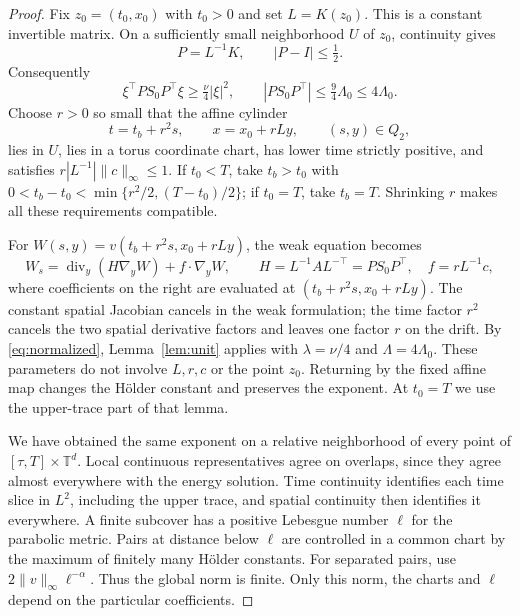 \documentclass[11pt]{article}
\newcommand{\T}{\mathbb T}
\newcommand{\diver}{\operatorname{div}}
\begin{document}
\begin{proof}
Fix $z_0=(t_0,x_0)$ with $t_0>0$ and set $L=K(z_0)$.
This is a constant invertible matrix. On a sufficiently small neighborhood
$U$ of $z_0$, continuity gives
\[
 P=L^{-1}K,\qquad |P-I|\le\tfrac12.
\]
Consequently
\begin{equation}\label{eq:normalized}
 \xi^\top PS_0P^\top\xi\ge\tfrac\nu4|\xi|^2,
 \qquad |PS_0P^\top|\le\tfrac94\Lambda_0\le4\Lambda_0.
\end{equation}
Choose $r>0$ so small that the affine cylinder
\[
 t=t_b+r^2s,\qquad x=x_0+rLy,\qquad (s,y)\in Q_2,
\]
lies in $U$, lies in a torus coordinate chart, has lower time strictly
positive, and satisfies $r|L^{-1}|\|c\|_\infty\le1$.
If $t_0<T$, take $t_b>t_0$ with
$0<t_b-t_0<\min\{r^2/2,(T-t_0)/2\}$; if $t_0=T$, take $t_b=T$.
Shrinking $r$ makes all these requirements compatible.

For $W(s,y)=v(t_b+r^2s,x_0+rLy)$, the weak equation becomes
\begin{equation}\label{eq:affine}
 W_s=\diver_y(H\nabla_yW)+f\cdot\nabla_yW,
 \qquad H=L^{-1}AL^{-\top}=PS_0P^\top,
 \quad f=rL^{-1}c,
\end{equation}
where coefficients on the right are evaluated at $(t_b+r^2s,x_0+rLy)$.
The constant spatial Jacobian cancels in the weak formulation; the time
factor $r^2$ cancels the two spatial derivative factors and leaves one
factor $r$ on the drift. By \eqref{eq:normalized}, Lemma~\ref{lem:unit}
applies with $\lambda=\nu/4$ and $\Lambda=4\Lambda_0$.
These parameters do not involve $L,r,c$ or the point $z_0$.
Returning by the fixed affine map changes the H\"older constant and
preserves the exponent. At $t_0=T$ we use the upper-trace part of that lemma.

We have obtained the same exponent on a relative neighborhood of every
point of $[\tau,T]\times\T^d$. Local continuous representatives agree on
overlaps, since they agree almost everywhere with the energy solution.
Time continuity identifies each time slice in $L^2$, including the upper
trace, and spatial continuity then identifies it everywhere.
A finite subcover has a positive Lebesgue number $\ell$ for the parabolic
metric. Pairs at distance below $\ell$ are controlled in a common chart
by the maximum of finitely many H\"older constants. For separated pairs,
use $2\|v\|_\infty\ell^{-\alpha}$. Thus the global norm is finite.
Only this norm, the charts and $\ell$ depend on the particular coefficients.
\end{proof}
\end{document}
